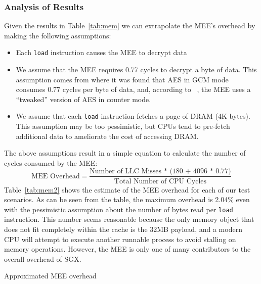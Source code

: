 \documentclass[../../../main.tex]{subfiles}
\begin{document}
\subsubsection*{Analysis of Results}
Given the results in Table~\ref{tab:mem} we can extrapolate the MEE's
overhead by making the following assumptions:
\begin{itemize}
  \item Each \texttt{load} instruction causes the MEE to decrypt data
  \item We assume that the MEE requires 0.77 cycles to decrypt a byte of data.
    This assumption comes from \cite{cyclesaes} where it was found that
    AES in GCM mode consumes 0.77 cycles per byte of data, and, according to
    ~\Intel, the MEE uses a ``tweaked'' version of AES in counter mode.
  \item We assume that each \texttt{load} instruction fetches a page
    of DRAM (4K bytes). This assumption may be too pessimistic, but CPUs
    tend to pre-fetch additional data to ameliorate the cost of accessing
    DRAM.
\end{itemize}
The above assumptions result in a simple equation to calculate the number
of cycles consumed by the MEE:
\begin{equation*}
  \text{MEE Overhead} = \frac{\text{Number of LLC Misses
    * (180 + 4096 * 0.77)}}{\text{Total Number of CPU Cycles}}
\end{equation*}
Table~\ref{tab:mem2} shows the estimate of the MEE overhead for each
of our test scenarios. As can be seen from the table, the maximum
overhead is 2.04\% even with the pessimistic assumption about the
number of bytes read per \texttt{load} instruction. This number seems
reasonable because the only memory object that does not fit completely
within the cache is the 32MB payload, and a modern CPU will attempt to
execute another runnable process to avoid stalling on memory
operations. However, the MEE is only one of many contributors to the
overall overhead of SGX.

\begin{table}[H]
  \caption{Approximated MEE overhead}
  \label{tab:mem2}
\end{table}
\end{document}
